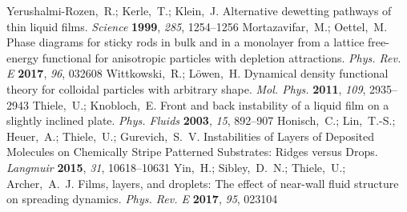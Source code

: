 \documentclass[journal=langd5,manuscript=article]{achemso}
\begin{document}
\begin{mcitethebibliography}{71}
{\mcitedefaultendpunct}{\mcitedefaultseppunct}\relax
\EndOfBibitem
{}
Yerushalmi-Rozen,~R.; Kerle,~T.; Klein,~J. Alternative dewetting pathways of
  thin liquid films. \emph{Science} \textbf{1999}, \emph{285}, 1254--1256\relax
\mciteBstWouldAddEndPuncttrue
\mciteSetBstMidEndSepPunct{\mcitedefaultmidpunct}
{\mcitedefaultendpunct}{\mcitedefaultseppunct}\relax
\EndOfBibitem
{}
Mortazavifar,~M.; Oettel,~M. Phase diagrams for sticky rods in bulk and in a
  monolayer from a lattice free-energy functional for anisotropic particles
  with depletion attractions. \emph{Phys. Rev. E} \textbf{2017}, \emph{96},
  032608\relax
\mciteBstWouldAddEndPuncttrue
\mciteSetBstMidEndSepPunct{\mcitedefaultmidpunct}
{\mcitedefaultendpunct}{\mcitedefaultseppunct}\relax
\EndOfBibitem
{}
Wittkowski,~R.; L{\"o}wen,~H. Dynamical density functional theory for colloidal
  particles with arbitrary shape. \emph{Mol. Phys.} \textbf{2011}, \emph{109},
  2935--2943\relax
\mciteBstWouldAddEndPuncttrue
\mciteSetBstMidEndSepPunct{\mcitedefaultmidpunct}
{\mcitedefaultendpunct}{\mcitedefaultseppunct}\relax
\EndOfBibitem
{}
Thiele,~U.; Knobloch,~E. Front and back instability of a liquid film on a
  slightly inclined plate. \emph{Phys. Fluids} \textbf{2003}, \emph{15},
  892--907\relax
\mciteBstWouldAddEndPuncttrue
\mciteSetBstMidEndSepPunct{\mcitedefaultmidpunct}
{\mcitedefaultendpunct}{\mcitedefaultseppunct}\relax
\EndOfBibitem
{}
Honisch,~C.; Lin,~T.-S.; Heuer,~A.; Thiele,~U.; Gurevich,~S.~V. Instabilities
  of Layers of Deposited Molecules on Chemically Stripe Patterned Substrates:
  Ridges versus Drops. \emph{Langmuir} \textbf{2015}, \emph{31},
  10618--10631\relax
\mciteBstWouldAddEndPuncttrue
\mciteSetBstMidEndSepPunct{\mcitedefaultmidpunct}
{\mcitedefaultendpunct}{\mcitedefaultseppunct}\relax
\EndOfBibitem
{}
Yin,~H.; Sibley,~D.~N.; Thiele,~U.; Archer,~A.~J. Films, layers, and droplets:
  The effect of near-wall fluid structure on spreading dynamics. \emph{Phys.
  Rev. E} \textbf{2017}, \emph{95}, 023104\relax
\mciteBstWouldAddEndPuncttrue
\mciteSetBstMidEndSepPunct{\mcitedefaultmidpunct}
{\mcitedefaultendpunct}{\mcitedefaultseppunct}\relax
\EndOfBibitem
\end{mcitethebibliography}
\end{document}
